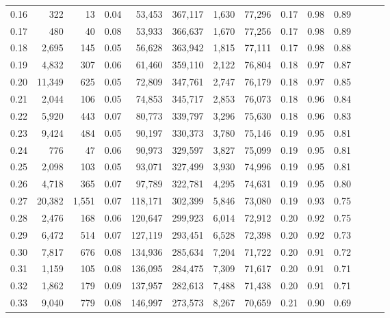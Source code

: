 \begin{tabular}{rrrrrrrrrrrrrr}
0.16 &     322 &     13 &  0.04 &   53,453 &  367,117 &   1,630 &  77,296 &  0.17 &  0.98 &      0.89 \\
0.17 &     480 &     40 &  0.08 &   53,933 &  366,637 &   1,670 &  77,256 &  0.17 &  0.98 &      0.89 \\
0.18 &   2,695 &    145 &  0.05 &   56,628 &  363,942 &   1,815 &  77,111 &  0.17 &  0.98 &      0.88 \\
0.19 &   4,832 &    307 &  0.06 &   61,460 &  359,110 &   2,122 &  76,804 &  0.18 &  0.97 &      0.87 \\
0.20 &  11,349 &    625 &  0.05 &   72,809 &  347,761 &   2,747 &  76,179 &  0.18 &  0.97 &      0.85 \\
0.21 &   2,044 &    106 &  0.05 &   74,853 &  345,717 &   2,853 &  76,073 &  0.18 &  0.96 &      0.84 \\
0.22 &   5,920 &    443 &  0.07 &   80,773 &  339,797 &   3,296 &  75,630 &  0.18 &  0.96 &      0.83 \\
0.23 &   9,424 &    484 &  0.05 &   90,197 &  330,373 &   3,780 &  75,146 &  0.19 &  0.95 &      0.81 \\
0.24 &     776 &     47 &  0.06 &   90,973 &  329,597 &   3,827 &  75,099 &  0.19 &  0.95 &      0.81 \\
0.25 &   2,098 &    103 &  0.05 &   93,071 &  327,499 &   3,930 &  74,996 &  0.19 &  0.95 &      0.81 \\
0.26 &   4,718 &    365 &  0.07 &   97,789 &  322,781 &   4,295 &  74,631 &  0.19 &  0.95 &      0.80 \\
0.27 &  20,382 &  1,551 &  0.07 &  118,171 &  302,399 &   5,846 &  73,080 &  0.19 &  0.93 &      0.75 \\
0.28 &   2,476 &    168 &  0.06 &  120,647 &  299,923 &   6,014 &  72,912 &  0.20 &  0.92 &      0.75 \\
0.29 &   6,472 &    514 &  0.07 &  127,119 &  293,451 &   6,528 &  72,398 &  0.20 &  0.92 &      0.73 \\
0.30 &   7,817 &    676 &  0.08 &  134,936 &  285,634 &   7,204 &  71,722 &  0.20 &  0.91 &      0.72 \\
0.31 &   1,159 &    105 &  0.08 &  136,095 &  284,475 &   7,309 &  71,617 &  0.20 &  0.91 &      0.71 \\
0.32 &   1,862 &    179 &  0.09 &  137,957 &  282,613 &   7,488 &  71,438 &  0.20 &  0.91 &      0.71 \\
0.33 &   9,040 &    779 &  0.08 &  146,997 &  273,573 &   8,267 &  70,659 &  0.21 &  0.90 &      0.69 \\

\end{tabular}
